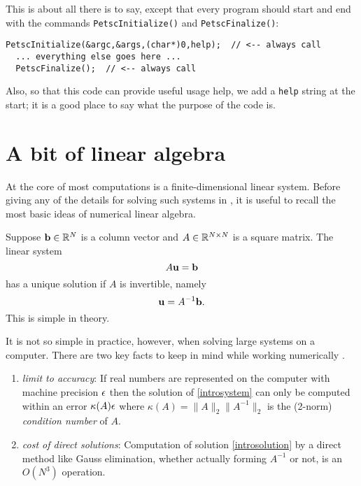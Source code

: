 This is about all there is to say, except that every \PETSc program should start and end with the commands \texttt{PetscInitialize()} and \texttt{PetscFinalize()}:
\begin{Verbatim}[fontsize=\small]
  PetscInitialize(&argc,&args,(char*)0,help);  // <-- always call
  ... everything else goes here ...
  PetscFinalize();  // <-- always call
\end{Verbatim}
Also, so that this \PETSc code can provide useful usage help, we add a \texttt{help} string at the start; it is a good place to say what the purpose of the code is.


\section{A bit of linear algebra}

At the core of most \PETSc computations is a finite-dimensional linear system.  Before giving any of the details for solving such systems in \PETSc, it is useful to recall the most basic ideas of numerical linear algebra.

Suppose $\mathbf{b}\in \mathbb{R}^{N}$ is a column vector and $A\in\mathbb{R}^{N\times N}$ is a square matrix.  The linear system
\begin{equation}
A \mathbf{u} = \mathbf{b} \label{introsystem}
\end{equation}
has a unique solution if $A$ is invertible, namely
\begin{equation}
\mathbf{u} = A^{-1} \mathbf{b}. \label{introsolution}
\end{equation}
This is simple in theory.

It is not so simple in practice, however, when solving large systems on a computer.  There are two key facts to keep in mind while working numerically  \citep{TrefethenBau}.
\renewcommand{\labelenumi}{\roman{enumi})}
\begin{enumerate}
\item \emph{limit to accuracy}:  If real numbers are represented on the computer with machine precision $\epsilon$ then the solution of \eqref{introsystem} can only be computed within an error $\kappa(A) \epsilon$ where $\kappa(A) = \|A\|_2 \|A^{-1}\|_2$ is the (2-norm) \emph{condition number} of $A$.
\item \emph{cost of direct solutions}:  Computation of solution \eqref{introsolution} by a direct method like Gauss elimination, whether actually forming $A^{-1}$ or not, is an $O(N^3)$ operation.
\end{enumerate}

